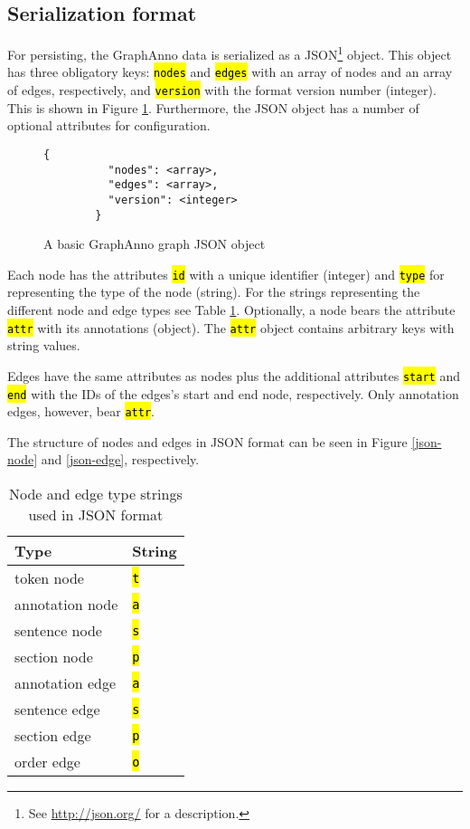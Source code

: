 \documentclass[12pt]{scrartcl}
\newcommand{\code}[1]{\hl{\texttt{#1}}}
\newenvironment{figurel}{\begin{figure}[htb]}{\end{figure}}
\newenvironment{tablel}{\begin{table}[htb]}{\end{table}}
\begin{document}
\subsection{Serialization format}\label{serialization-format}

For persisting, the GraphAnno data is serialized as a JSON\footnote{See \url{http://json.org/} for a description.} object.
This object has three obligatory keys: \code{nodes} and \code{edges} with an array of nodes and an array of edges, respectively, and \code{version} with the format version number (integer).
This is shown in Figure \ref{json-basic}.
Furthermore, the JSON object has a number of optional attributes for configuration.

\begin{figurel}
	\begin{lstlisting}[gobble=8]
		{
		  "nodes": <array>,
		  "edges": <array>,
		  "version": <integer>
		}
	\end{lstlisting}
	\caption{A basic GraphAnno graph JSON object}
	\label{json-basic}
\end{figurel}

Each node has the attributes \code{id} with a unique identifier (integer) and \code{type} for representing the type of the node (string).
For the strings representing the different node and edge types see Table \ref{types-strings}.
Optionally, a node bears the attribute \code{attr} with its annotations (object).
The \code{attr} object contains arbitrary keys with string values.

Edges have the same attributes as nodes plus the additional attributes \code{start} and \code{end} with the IDs of the edges’s start and end node, respectively.
Only annotation edges, however, bear \code{attr}.

The structure of nodes and edges in JSON format can be seen in Figure \ref{json-node} and \ref{json-edge}, respectively.

\begin{tablel}
	\begin{center}
		\begin{tabular*}{12em}{@{\extracolsep{\fill}} ll}
			\toprule
			Type & String\\
			\midrule
			token node & \code{t}\\
			annotation node & \code{a}\\
			sentence node & \code{s}\\
			section node & \code{p}\\
			\midrule
			annotation edge & \code{a}\\
			sentence edge & \code{s}\\
			section edge & \code{p}\\
			order edge & \code{o}\\
			\bottomrule
		\end{tabular*}
	\end{center}
	\caption{Node and edge type strings used in JSON format}
	\label{types-strings}
\end{tablel}
\end{document}
